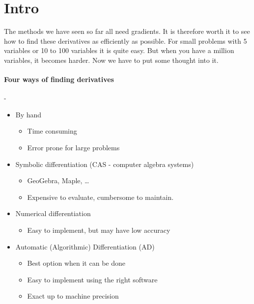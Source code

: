 \documentclass{article}
\begin{document}
\maketitle

\section{Intro}

The methods we have seen so far all need gradients. It is therefore worth it to see how to find these
derivatives as efficiently as possible. For small problems with 5 variables or 10 to 100 variables it is quite easy. But 
when you have a million variables, it becomes harder. Now we have to put some thought into it. 

\paragraph{Four ways of finding derivatives}- 
\begin{itemize}
  \item By hand 
  \begin{itemize}
    \item Time consuming 
    \item Error prone for large problems
  \end{itemize}
  \item Symbolic differentiation (CAS - computer algebra systems)
  \begin{itemize}
    \item  GeoGebra, Maple, \dots
    \item Expensive to evaluate, cumbersome to maintain.
  \end{itemize}
  \item Numerical differentiation
  \begin{itemize}
    \item Easy to implement, but may have low accuracy
  \end{itemize}
  \item Automatic (Algorithmic) Differentiation (AD)
  \begin{itemize}
    \item Best option when it can be done
    \item Easy to implement using the right software
    \item Exact up to machine precision
  \end{itemize}
\end{itemize}
\end{document}

